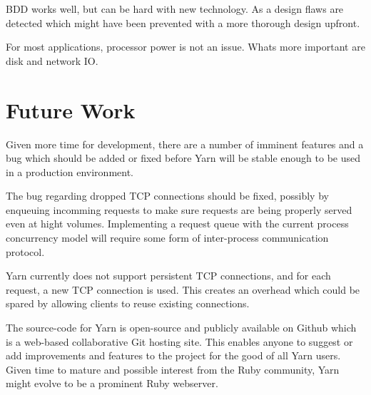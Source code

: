 
BDD works well, but can be hard with new technology. As a design flaws are
detected which might have been prevented with a more thorough design upfront.

For most applications, processor power is not an issue. Whats more important
are disk and network IO.


\section{Future Work}
Given more time for development, there are a number of imminent features and
a bug which should be added or fixed before Yarn will be stable enough to be
used in a production environment.

The bug regarding dropped TCP connections should be fixed, possibly by
enqueuing incomming requests to make sure requests are being properly served
even at hight volumes. Implementing a request queue with the current process
concurrency model will require some form of inter-process communication
protocol.

Yarn currently does not support persistent TCP connections, and for each
request, a new TCP connection is used. This creates an overhead which could be
spared by allowing clients to reuse existing connections.

The source-code for Yarn is open-source and publicly available on Github which
is a web-based collaborative Git hosting site. This enables anyone to suggest
or add improvements and features to the project for the good of all Yarn
users. Given time to mature and possible interest from the Ruby community,
Yarn might evolve to be a prominent Ruby webserver.
